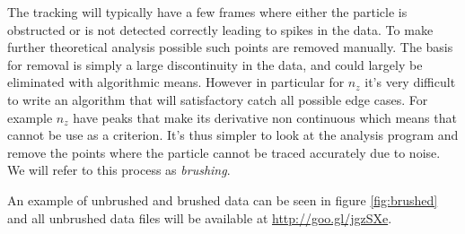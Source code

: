 The tracking will typically have a few frames where either the particle is obstructed or is not detected correctly 
leading to spikes in the data. To make further theoretical analysis possible such points are removed manually. The basis for removal is simply a large discontinuity in the data, and could largely be eliminated with algorithmic means. However in particular for $n_z$ it's very difficult to write an algorithm that will satisfactory catch all possible edge cases. For example $n_z$ have peaks that make its derivative non continuous which means that cannot be use as a criterion. It's thus simpler to look at the analysis program and remove the points where the particle cannot be traced accurately due to noise. We will refer to this process as \emph{brushing}.

An example of unbrushed and brushed data can be seen in figure \ref{fig:brushed} and all unbrushed data files will be 
available at \url{http://goo.gl/jgzSXe}.

